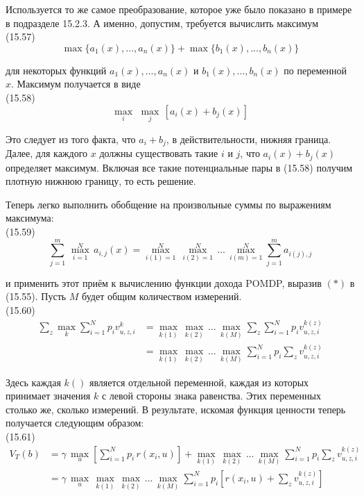 \documentclass[10pt,a4paper]{article}
\begin{document}
Используется то же самое преобразование, которое уже было показано в примере в подразделе 15.2.3.
А именно, допустим, требуется вычислить максимум\\

(15.57)
$$\max\{a_1(x),...,a_n(x)\}+\max\{b_1(x),...,b_n(x)\}$$ 

для некоторых функций $a_1(x),...,a_n(x)$ и $b_1(x),...,b_n(x)$ по переменной $x$.
Максимум получается в виде\\

(15.58)
$$\underset{i}{\max}\,\,\underset{j}{\max}\,[a_i(x)+b_j(x)]$$

Это следует из того факта, что $a_i + b_j$, в действительности, нижняя граница. Далее, для каждого $x$ должны существовать такие $i$ и $j$, что $a_i(x)+b_j(x)$ определяет максимум. Включая все такие потенциальные пары в (15.58) получим плотную нижнюю границу, то есть решение.

Теперь легко выполнить обобщение на произвольные суммы по выражениям максимума:\\

(15.59)
$$\sum_{j=1}^m\,\underset{i=1}{\overset{N}{\max}}\,a_{i,j}(x)=\underset{i(1)=1}{\overset{N}{\max}}\,\underset{i(2)=1}{\overset{N}{\max}}\,...\,\underset{i(m)=1}{\overset{N}{\max}}\sum_{j=1}^ma_{i(j),j}$$

и применить этот приём к вычислению функции дохода POMDP, выразив $(\ast)$ в (15.55). Пусть $M$ будет общим количеством измерений.\\

(15.60)
\begin{equation*}
\begin{split}
\sum_z\underset{k}{\max}\sum_{i=1}^Np_iv_{u,z,i}^k&=\underset{k(1)}{\max}\,\underset{k(2)}{\max}\,...\,\underset{k(M)}{\max}\sum_z\sum_{i=1}^Np_iv_{u,z,i}^{k(z)}\\
&=\underset{k(1)}{\max}\,\underset{k(2)}{\max}\,...\,\underset{k(M)}{\max}\sum_{i=1}^Np_i\sum_zv_{u,z,i}^{k(z)}
\end{split}
\end{equation*}

Здесь каждая $k( )$ является отдельной переменной, каждая из которых принимает значения $k$ с левой стороны знака равенства. Этих переменных столько же, сколько измерений. В результате, искомая функция ценности теперь получается следующим образом:\\

(15.61)
\begin{equation*}
\begin{split}
V_T(b)&=\gamma\,\underset{u}{\max}\left[ \sum_{i=1}^Np_i\,r(x_i,u)\right] +\underset{k(1)}{\max}\,\underset{k(2)}{\max}\,...\,\underset{k(M)}{\max}\sum_{i=1}^Np_i\sum_zv_{u,z,i}^{k(z)}\\
&=\gamma\,\underset{u}{\max}\,\underset{k(1)}{\max}\,\underset{k(2)}{\max}\,...\,\underset{k(M)}{\max}\sum_{i=1}^Np_i\left[ r(x_i,u)+\sum_zv_{u,z,i}^{k(z)}\right] 
\end{split}
\end{equation*}
\end{document}
